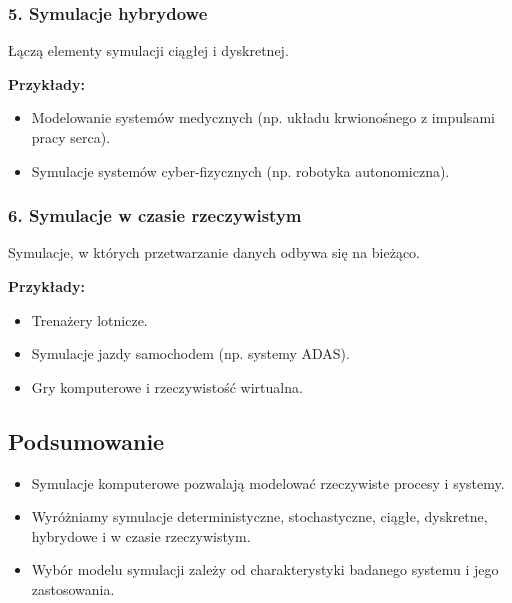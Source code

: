 \subsubsection{5. Symulacje hybrydowe}
Łączą elementy symulacji ciągłej i dyskretnej.

\textbf{Przykłady:}
\begin{itemize}
    \item Modelowanie systemów medycznych (np. układu krwionośnego z impulsami pracy serca).
    \item Symulacje systemów cyber-fizycznych (np. robotyka autonomiczna).
\end{itemize}

\subsubsection{6. Symulacje w czasie rzeczywistym}
Symulacje, w których przetwarzanie danych odbywa się na bieżąco.

\textbf{Przykłady:}
\begin{itemize}
    \item Trenażery lotnicze.
    \item Symulacje jazdy samochodem (np. systemy ADAS).
    \item Gry komputerowe i rzeczywistość wirtualna.
\end{itemize}

\subsection{Podsumowanie}
\begin{itemize}
    \item Symulacje komputerowe pozwalają modelować rzeczywiste procesy i systemy.
    \item Wyróżniamy symulacje deterministyczne, stochastyczne, ciągłe, dyskretne, hybrydowe i w czasie rzeczywistym.
    \item Wybór modelu symulacji zależy od charakterystyki badanego systemu i jego zastosowania.
\end{itemize}
